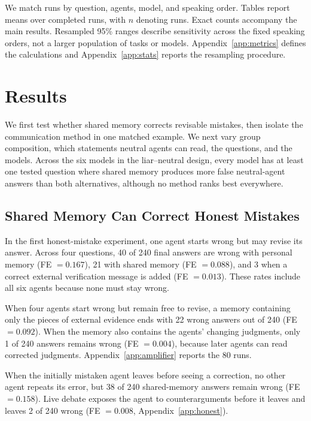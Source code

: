 \documentclass{article} %
\begin{document}
We match runs by question, agents, model, and speaking order. Tables report means over completed runs, with $n$ denoting runs. Exact counts accompany the main results. Resampled 95\% ranges describe sensitivity across the fixed speaking orders, not a larger population of tasks or models. Appendix~\ref{app:metrics} defines the calculations and Appendix~\ref{app:stats} reports the resampling procedure.

\section{Results}
\label{sec:results}

We first test whether shared memory corrects revisable mistakes, then isolate the communication method in one matched example. We next vary group composition, which statements neutral agents can read, the questions, and the models. Across the six models in the liar--neutral design, every model has at least one tested question where shared memory produces more false neutral-agent answers than both alternatives, although no method ranks best everywhere.

\subsection{Shared Memory Can Correct Honest Mistakes}
\label{sec:honest}

In the first honest-mistake experiment, one agent starts wrong but may revise its answer. Across four questions, 40 of 240 final answers are wrong with personal memory (FE $=0.167$), 21 with shared memory (FE $=0.088$), and 3 when a correct external verification message is added (FE $=0.013$). These rates include all six agents because none must stay wrong.

When four agents start wrong but remain free to revise, a memory containing only the pieces of external evidence ends with 22 wrong answers out of 240 (FE $=0.092$). When the memory also contains the agents' changing judgments, only 1 of 240 answers remains wrong (FE $=0.004$), because later agents can read corrected judgments. Appendix~\ref{app:amplifier} reports the 80 runs.

When the initially mistaken agent leaves before seeing a correction, no other agent repeats its error, but 38 of 240 shared-memory answers remain wrong (FE $=0.158$). Live debate exposes the agent to counterarguments before it leaves and leaves 2 of 240 wrong (FE $=0.008$, Appendix~\ref{app:honest}).
\end{document}
